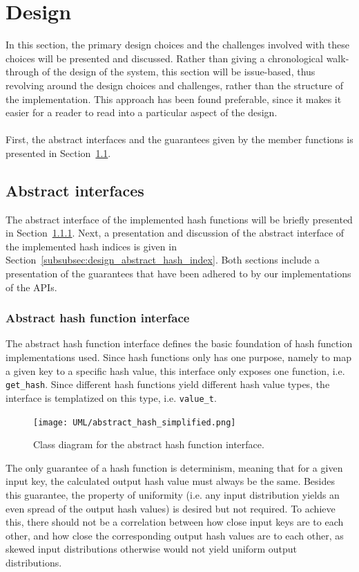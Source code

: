 \documentclass[11pt]{article} %
\begin{document}
\section{Design}
In this section, the primary design choices and the challenges involved with these choices will be presented and discussed. Rather than giving a chronological walk-through of the design of the system, this section will be issue-based, thus revolving around the design choices and challenges, rather than the structure of the implementation. This approach has been found preferable, since it makes it easier for a reader to read into a particular aspect of the design.\\
\\
First, the abstract interfaces and the guarantees given by the member functions is presented in Section~\ref{subsec:design_abstract_interfaces}. 
\subsection{Abstract interfaces}
\label{subsec:design_abstract_interfaces}
The abstract interface of the implemented hash functions will be briefly presented in Section~\ref{subsubsec:design_abstract_hash_function}. Next, a presentation and discussion of the abstract interface of the implemented hash indices is given in Section~\ref{subsubsec:design_abstract_hash_index}. Both sections include a presentation of the guarantees that have been adhered to by our implementations of the APIs.
\subsubsection{Abstract hash function interface}
\label{subsubsec:design_abstract_hash_function}
The abstract hash function interface defines the basic foundation of hash function implementations used. Since hash functions only has one purpose, namely to map a given key to a specific hash value, this interface only exposes one function, i.e. \verb|get_hash|. Since different hash functions yield different hash value types, the interface is templatized on this type, i.e. \verb|value_t|.
\begin{figure}[H]
  \centering
  \texttt{[image: UML/abstract\_hash\_simplified.png]}\\
  \caption{Class diagram for the abstract hash function interface.}\label{fig:UML_abstract_hash_function}
\newpage
\end{figure}
\noindent
The only guarantee of a hash function is determinism, meaning that for a given input key, the calculated output hash value must always be the same. Besides this guarantee, the property of uniformity (i.e. any input distribution yields an even spread of the output hash values) is desired but not required. To achieve this, there should not be a correlation between how close input keys are to each other, and how close the corresponding output hash values are to each other, as skewed input distributions otherwise would not yield uniform output distributions.
\end{document}
